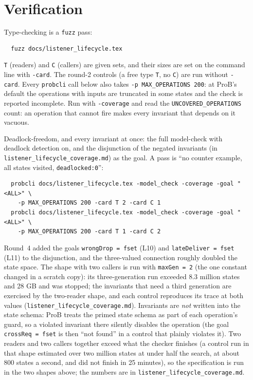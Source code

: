 \documentclass[a4paper,10pt,fleqn]{article}
\begin{document}
\section{Verification}
\label{sec:verify}

Type-checking is a \texttt{fuzz} pass:
\begin{verbatim}
  fuzz docs/listener_lifecycle.tex
\end{verbatim}

\texttt{T} (readers) and \texttt{C} (callers) are given sets, and their sizes
are set on the command line with \texttt{-card}.  The round-2 controls (a free
type \texttt{T}, no \texttt{C}) are run without \texttt{-card}.  Every
\texttt{probcli} call below also takes \texttt{-p MAX\_OPERATIONS 200}: at
ProB's default the operations with inputs are truncated in some states and the
check is reported incomplete.  Run with \texttt{-coverage} and read the
\texttt{UNCOVERED\_OPERATIONS} count: an operation that cannot fire makes every
invariant that depends on it vacuous.

Deadlock-freedom, and every invariant at once: the full model-check with
deadlock detection on, and the disjunction of the negated invariants (in
\texttt{listener\_lifecycle\_coverage.md}) as the goal.  A pass is ``no
counter example, all states visited, \texttt{deadlocked:0}'':
\begin{verbatim}
  probcli docs/listener_lifecycle.tex -model_check -coverage -goal "<ALL>" \
    -p MAX_OPERATIONS 200 -card T 2 -card C 1
  probcli docs/listener_lifecycle.tex -model_check -coverage -goal "<ALL>" \
    -p MAX_OPERATIONS 200 -card T 1 -card C 2
\end{verbatim}
Round~4 added the goals \texttt{wrongDrop = fset} (L10) and \texttt{lateDeliver
= fset} (L11) to the disjunction, and the three-valued connection roughly
doubled the state space.  The shape with two callers is run with
\texttt{maxGen = 2} (the one constant changed in a scratch copy): its
three-generation run exceeded 8.3 million states and 28 GB and was stopped; the
invariants that need a third generation are exercised by the two-reader shape,
and each control reproduces its trace at both values
(\texttt{listener\_lifecycle\_coverage.md}).
Invariants are \emph{not} written into the state schema: ProB treats the
primed state schema as part of each operation's guard, so a violated
invariant there silently disables the operation (the goal \texttt{crossReq =
fset} is then ``not found'' in a control that plainly violates it).
Two readers and two callers together exceed what the checker finishes (a
control run in that shape estimated over two million states at under half the
search, at about 800 states a second, and did not finish in 25 minutes), so the
specification is run in the two shapes above; the numbers are in
\texttt{listener\_lifecycle\_coverage.md}.
\end{document}

